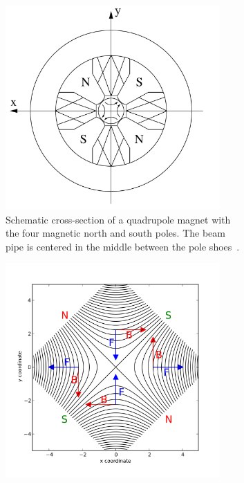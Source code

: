 \begin{figure}
\begin{subfigure}[t]{0.49\textwidth}
\centering
 \includegraphics[width=0.9\textwidth]{Figures/Quadrupole.png}
\caption[Cross-section of a quadrupole magnet]{Schematic cross-section of a quadrupole magnet with the four magnetic north and south poles.
The beam pipe is centered in the middle between the pole shoes~\cite[p. 88]{Hinterberger}.}
\label{fig:Quadrupole:cross_section}
\end{subfigure}\hfill
\begin{subfigure}[t]{0.49\textwidth}
\centering
 \includegraphics[width=0.9\textwidth]{Figures/Magnetic_field_quadrupole.png}

\end{subfigure}
\end{figure}

